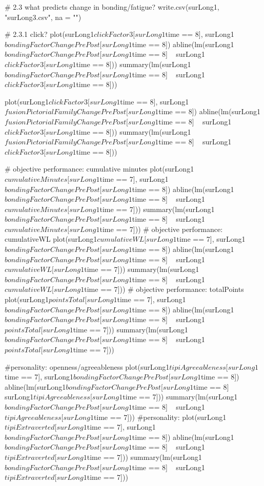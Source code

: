 # 2.3 what predicts change in bonding/fatigue?
write.csv(surLong1, "surLong3.csv", na = "")

# 2.3.1 click?
plot(surLong1$clickFactor3[surLong1$time == 8], surLong1$bondingFactorChangePrePost[surLong1$time == 8])
abline(lm(surLong1$bondingFactorChangePrePost[surLong1$time == 8] ~ surLong1$clickFactor3[surLong1$time == 8]))
summary(lm(surLong1$bondingFactorChangePrePost[surLong1$time == 8] ~ surLong1$clickFactor3[surLong1$time == 8]))

plot(surLong1$clickFactor3[surLong1$time == 8], surLong1$fusionPictorialFamilyChangePrePost[surLong1$time == 8])
abline(lm(surLong1$fusionPictorialFamilyChangePrePost[surLong1$time == 8] ~ surLong1$clickFactor3[surLong1$time == 8]))
summary(lm(surLong1$fusionPictorialFamilyChangePrePost[surLong1$time == 8] ~ surLong1$clickFactor3[surLong1$time == 8]))

# objective performance: cumulative minutes
plot(surLong1$cumulativeMinutes[surLong1$time == 7], surLong1$bondingFactorChangePrePost[surLong1$time == 8])
abline(lm(surLong1$bondingFactorChangePrePost[surLong1$time == 8] ~ surLong1$cumulativeMinutes[surLong1$time == 7]))
summary(lm(surLong1$bondingFactorChangePrePost[surLong1$time == 8] ~ surLong1$cumulativeMinutes[surLong1$time == 7]))
# objective performance: cumulativeWL
plot(surLong1$cumulativeWL[surLong1$time == 7], surLong1$bondingFactorChangePrePost[surLong1$time == 8])
abline(lm(surLong1$bondingFactorChangePrePost[surLong1$time == 8] ~ surLong1$cumulativeWL[surLong1$time == 7]))
summary(lm(surLong1$bondingFactorChangePrePost[surLong1$time == 8] ~ surLong1$cumulativeWL[surLong1$time == 7]))
# objective performance: totalPoints
plot(surLong1$pointsTotal[surLong1$time == 7], surLong1$bondingFactorChangePrePost[surLong1$time == 8])
abline(lm(surLong1$bondingFactorChangePrePost[surLong1$time == 8] ~ surLong1$pointsTotal[surLong1$time == 7]))
summary(lm(surLong1$bondingFactorChangePrePost[surLong1$time == 8] ~ surLong1$pointsTotal[surLong1$time == 7]))

#personality: openness/agreeableness
plot(surLong1$tipiAgreeableness[surLong1$time == 7], surLong1$bondingFactorChangePrePost[surLong1$time == 8])
abline(lm(surLong1$bondingFactorChangePrePost[surLong1$time == 8] ~ surLong1$tipiAgreeableness[surLong1$time == 7]))
summary(lm(surLong1$bondingFactorChangePrePost[surLong1$time == 8] ~ surLong1$tipiAgreeableness[surLong1$time == 7]))
#personality:
plot(surLong1$tipiExtraverted[surLong1$time == 7], surLong1$bondingFactorChangePrePost[surLong1$time == 8])
abline(lm(surLong1$bondingFactorChangePrePost[surLong1$time == 8] ~ surLong1$tipiExtraverted[surLong1$time == 7]))
summary(lm(surLong1$bondingFactorChangePrePost[surLong1$time == 8] ~ surLong1$tipiExtraverted[surLong1$time == 7]))


